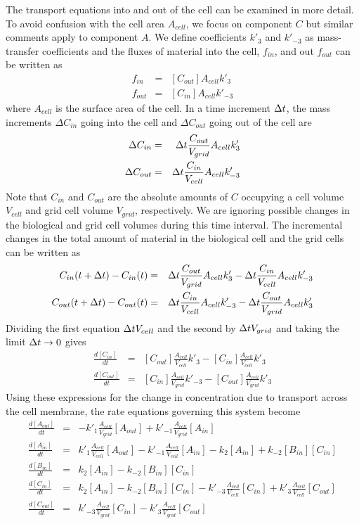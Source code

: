 \documentclass[12pt]{article}
\begin{document}
The transport equations into and out of the cell can be examined in more detail.
To avoid confusion with the cell area $A_{cell}$, we focus on component $C$ but similar comments
apply to component $A$. We define coefficients $k'_3$ and $k'_{-3}$ as mass-transfer
coefficients and the fluxes of material into the cell, $f_{in}$, and out $f_{out}$ can be written
as
\begin{eqnarray*}
f_{in} &=& [C_{out}]A_{cell}k'_3 \\
f_{out} &=& [C_{in}]A_{cell}k'_{-3}
\end{eqnarray*}
where $A_{cell}$ is the surface area of the cell.
In a time increment $\Delta t$, the mass increments $\Delta C_{in}$ going into the cell and $\Delta
C_{out}$ going out of the cell are
\begin{eqnarray*}
\Delta C_{in} &=& \Delta t \frac{C_{out}}{V_{grid}}A_{cell}k'_3\\
\Delta C_{out} &=& \Delta t \frac{C_{in}}{V_{cell}}A_{cell}k'_{-3}
\end{eqnarray*}
Note that $C_{in}$ and $C_{out}$ are the absolute amounts of $C$ occupying a cell volume $V_{cell}$
and grid cell volume $V_{grid}$, respectively. We are ignoring possible changes in the biological
and grid cell volumes during this time interval. The incremental changes in the total amount of
material in the biological cell and the grid cells can be written as
\begin{eqnarray*}
C_{in}(t+\Delta t)-C_{in}(t) &=& \Delta t \frac{C_{out}}{V_{grid}}A_{cell}k'_3 - \Delta t\frac{C_{in}}{V_{cell}}
A_{cell}k'_{-3} \\
C_{out}(t+\Delta t)-C_{out}(t) &=& \Delta t \frac{C_{in}}{V_{cell}}A_{cell}k'_{-3} - \Delta t\frac{C_{out}}{V_{grid}}
A_{cell}k'_3
\end{eqnarray*}
Dividing the first equation $\Delta t V_{cell}$ and the second by $\Delta t V_{grid}$ and taking the limit $\Delta t
\rightarrow 0$ gives
\begin{eqnarray*}
\frac{d [C_{in}]}{dt} &=& [C_{out}]\frac{A_{cell}}{V_{cell}}k'_3 - [C_{in}]\frac{A_{cell}}{V_{cell}}
k'_3 \\
\frac{d[C_{out}]}{dt} &=& [C_{in}]\frac{A_{cell}}{V_{grid}}k'_{-3} - [C_{out}]\frac{A_{cell}}{V_{grid}}
k'_3
\end{eqnarray*}
Using these expressions for the change in concentration due to transport across the cell membrane, the
rate equations governing this system become
\begin{eqnarray*}
\frac{d [A_{out}]}{d t} &=&-k'_1\frac{A_{cell}}{V_{grid}} [A_{out}]
+k'_{-1}\frac{A_{cell}}{V_{grid}} [A_{in}] \\
\frac{d [A_{in}]}{d t} &=&k'_1\frac{A_{cell}}{V_{cell}} [A_{out}]
-k'_{-1}\frac{A_{cell}}{V_{cell}} [A_{in}] - k_2 [A_{in}]
 + k_{-2}[B_{in}][C_{in}]\\
\frac{d [B_{in}]}{d t} &=&k_2 [A_{in}] - k_{-2}[B_{in}][C_{in}]\\
\frac{d [C_{in}]}{d t} &=&k_2 [A_{in}] - k_{-2}[B_{in}][C_{in}]
-k'_{-3} \frac{A_{cell}}{V_{cell}}[C_{in}]
+ k'_3\frac{A_{cell}}{V_{cell}} [C_{out}] \\
\frac{d [C_{out}]}{d t} &=&k'_{-3} \frac{A_{cell}}{V_{grid}}[C_{in}]
-k'_3\frac{A_{cell}}{V_{grid}} [C_{out}]
\end{eqnarray*}
\end{document}

